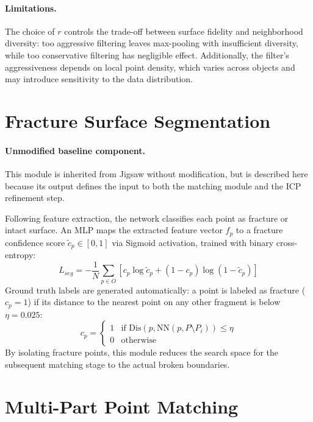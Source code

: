 \paragraph{Limitations.}
The choice of $r$ controls the trade-off between surface fidelity and neighborhood diversity: too aggressive filtering leaves max-pooling with insufficient diversity, while too conservative filtering has negligible effect. Additionally, the filter's aggressiveness depends on local point density, which varies across objects and may introduce sensitivity to the data distribution.

\section{Fracture Surface Segmentation}
\paragraph{Unmodified baseline component.} This module is inherited from Jigsaw without modification, but is described here because its output defines the input to both the matching module and the ICP refinement step.

Following feature extraction, the network classifies each point as fracture or intact surface. An MLP maps the extracted feature vector \(f_p\) to a fracture confidence score \(\tilde{c}_p \in [0,1]\) via Sigmoid activation, trained with binary cross-entropy:
\begin{equation}
    \label{eq:seg_loss}
    L_{seg} =
    -\frac{1}{N} \sum_{p \in O}
    \left[
    c_p \log \tilde{c}_p
    +
    (1 - c_p) \log(1 - \tilde{c}_p)
    \right]
    \end{equation}
Ground truth labels are generated automatically: a point is labeled as fracture (\(c_p = 1\)) if its distance to the nearest point on any other fragment is below \(\eta = 0.025\):
\begin{equation}
\label{eq:gt_label}
c_p = \begin{cases} 1 & \text{if } \text{Dis}(p, \text{NN}(p, P \setminus P_i)) \leq \eta \\ 0 & \text{otherwise} \end{cases}
\end{equation}
By isolating fracture points, this module reduces the search space for the subsequent matching stage to the actual broken boundaries.

\section{Multi-Part Point Matching}
